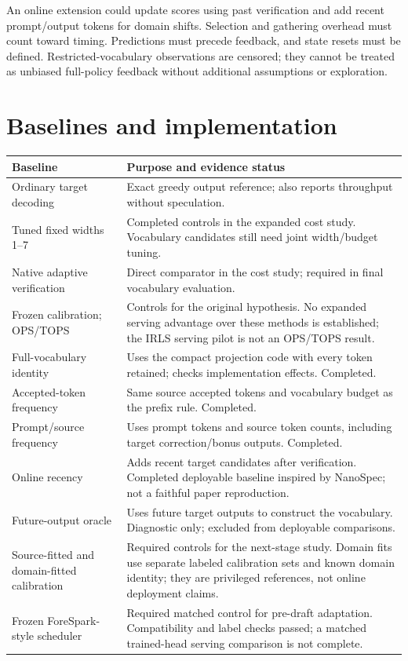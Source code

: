\documentclass[10pt]{article}
\begin{document}
An online extension could update scores using past verification and add recent prompt/output tokens for domain shifts. Selection and gathering overhead must count toward timing. Predictions must precede feedback, and state resets must be defined. Restricted-vocabulary observations are censored; they cannot be treated as unbiased full-policy feedback without additional assumptions or exploration.
\newpage
\section{Baselines and implementation}
\begin{tabularx}{\linewidth}{@{}p{.28\linewidth}X@{}}
\toprule
Baseline & Purpose and evidence status \\
\midrule
Ordinary target decoding & Exact greedy output reference; also reports throughput without speculation. \\
Tuned fixed widths 1--7 & Completed controls in the expanded cost study. Vocabulary candidates still need joint width/budget tuning. \\
Native adaptive verification & Direct comparator in the cost study; required in final vocabulary evaluation. \\
Frozen calibration; OPS/TOPS & Controls for the original hypothesis. No expanded serving advantage over these methods is established; the IRLS serving pilot is not an OPS/TOPS result. \\
Full-vocabulary identity & Uses the compact projection code with every token retained; checks implementation effects. Completed. \\
Accepted-token frequency & Same source accepted tokens and vocabulary budget as the prefix rule. Completed. \\
Prompt/source frequency & Uses prompt tokens and source token counts, including target correction/bonus outputs. Completed. \\
Online recency & Adds recent target candidates after verification. Completed deployable baseline inspired by NanoSpec; not a faithful paper reproduction. \\
Future-output oracle & Uses future target outputs to construct the vocabulary. Diagnostic only; excluded from deployable comparisons. \\
Source-fitted and domain-fitted calibration & Required controls for the next-stage study. Domain fits use separate labeled calibration sets and known domain identity; they are privileged references, not online deployment claims. \\
Frozen ForeSpark-style scheduler & Required matched control for pre-draft adaptation. Compatibility and label checks passed; a matched trained-head serving comparison is not complete. \\
\bottomrule
\end{tabularx}
\end{document}
